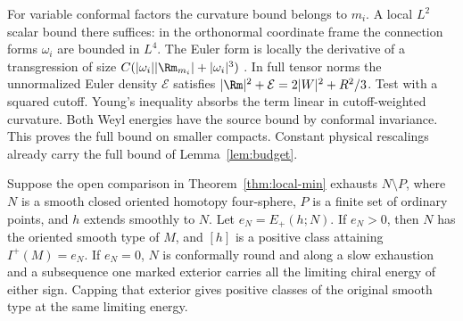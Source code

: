 For variable conformal factors the curvature bound belongs to
\(m_i\). A local \(L^2\) scalar bound there suffices: in the
orthonormal coordinate frame the connection forms \(\omega_i\)
are bounded in \(L^4\). The Euler form is locally the derivative
of a transgression of size
\(C(|\omega_i||\Rm_{m_i}|+|\omega_i|^3)\)
\cite[\S3]{ChernSimons1974Characteristic}. In full tensor norms
the unnormalized Euler density \(\mathcal E\) satisfies
\(|\Rm|^2+\mathcal E=2|W|^2+R^2/3\).
Test with a squared cutoff. Young's inequality absorbs the term
linear in cutoff-weighted curvature. Both Weyl energies have the
source bound by conformal invariance. This proves the full bound
on smaller compacts. Constant physical rescalings already carry
the full bound of Lemma~\ref{lem:budget}.

\begin{corollary}\label{cor:whole-base}
Suppose the open comparison in Theorem~\ref{thm:local-min} exhausts
\(N\setminus P\), where \(N\) is a smooth closed oriented homotopy
four-sphere, \(P\) is a finite set of ordinary points, and \(h\)
extends smoothly to \(N\). Let \(e_N=E_+(h;N)\).
If \(e_N>0\), then \(N\) has the oriented smooth type of \(M\), and
\([h]\) is a positive class attaining \(I^+(M)=e_N\).
If \(e_N=0\), \(N\) is conformally round and along a slow exhaustion
and a subsequence one marked exterior carries all the limiting chiral
energy of either sign. Capping that exterior gives positive classes
of the original smooth type at the same limiting energy.
\end{corollary}

